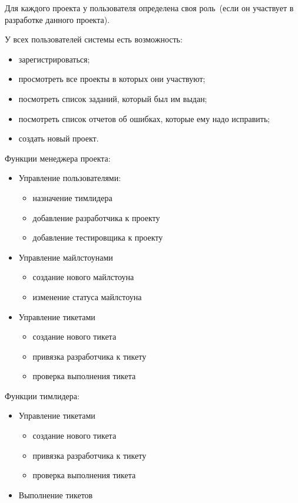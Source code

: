 Для каждого проекта у пользователя определена своя роль~(если он участвует в разработке данного проекта).

У всех пользователей системы есть возможность:
\begin{itemize}
\item зарегистрироваться;
\item просмотреть все проекты в которых они участвуют;
\item посмотреть список заданий, который был им выдан;
\item посмотреть список отчетов об ошибках, которые ему надо исправить;
\item создать новый проект.
\end{itemize}

Функции менеджера проекта:
\begin{itemize}
\item Управление пользователями:
	\begin{itemize}
	\item назначение тимлидера
	\item добавление разработчика к проекту
	\item добавление тестировщика к проекту
	\end{itemize}

\item Управление майлстоунами
	\begin{itemize}
	\item создание нового майлстоуна
	\item изменение статуса майлстоуна
	\end{itemize}

\item Управление тикетами
	\begin{itemize}
	\item создание нового тикета
	\item привязка разработчика к тикету
	\item проверка выполнения тикета
	\end{itemize}
\end{itemize}

Функции тимлидера:
\begin{itemize}
\item Управление тикетами
	\begin{itemize}
	\item создание нового тикета
	\item привязка разработчика к тикету
	\item проверка выполнения тикета
	\end{itemize}

\item Выполнение тикетов
\end{itemize}

